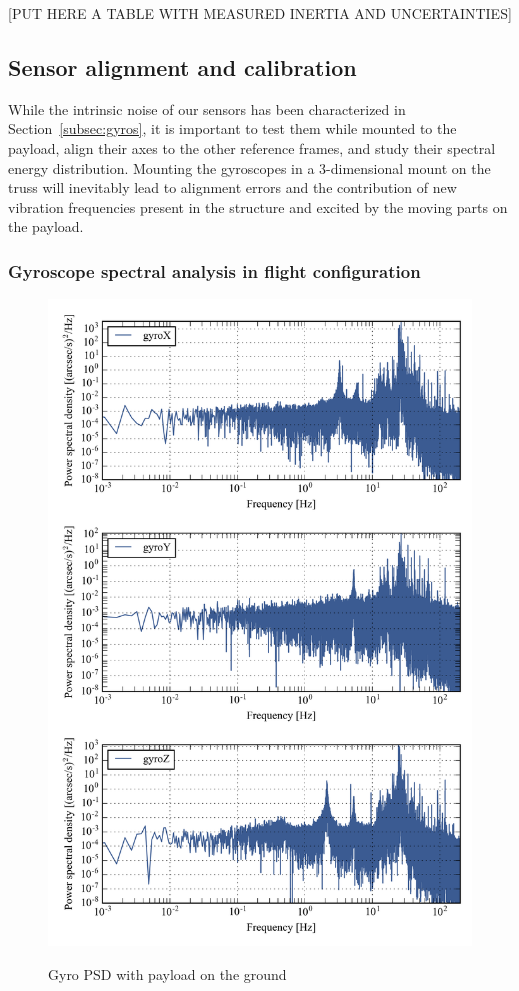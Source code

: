 [PUT HERE A TABLE WITH MEASURED INERTIA AND UNCERTAINTIES]

\subsection{Sensor alignment and calibration}
While the intrinsic noise of our sensors has been characterized in Section~\ref{subsec:gyros}, it is important to test them while mounted to the payload, align their axes to the other reference frames, and study their spectral energy distribution. Mounting the gyroscopes in a 3-dimensional mount on the truss will inevitably lead to alignment errors and the contribution of new vibration frequencies present in the structure and excited by the moving parts on the payload.


\subsubsection{Gyroscope spectral analysis in flight configuration}

\begin{figure}[!h]
\begin{center}
\includegraphics[width=\textwidth]{Figures/multiPSD400.png}
\label{fig:multiPSD400}
\caption[Gyro PSD with payload on the ground]{Gyro PSD with payload on the ground}
\end{center}
\end{figure}

